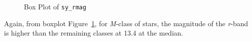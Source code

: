 \documentclass[
  letterpaper,
  DIV=11,
  numbers=noendperiod]{scrartcl}
\begin{document}
\begin{longtable}[]
\end{longtable}

\begin{figure}[H]


\caption{\label{fig-sy-rmag}Box Plot of \texttt{sy\_rmag}}

\end{figure}%

Again, from boxplot Figure~\ref{fig-sy-rmag}, for \emph{M}-class of
stars, the magnitude of the \emph{r}-band is higher than the remaining
classes at 13.4 at the median.
\end{document}
